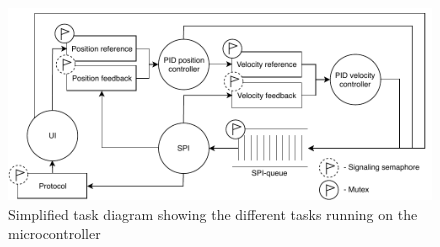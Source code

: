 \documentclass[../../main.tex]{subfiles}
\begin{document}

\begin{figure}[H]
    \centering
    \includegraphics[width=\textwidth]{Sections/System_Implementation/Images/OverviewTaskDiagramSimple.pdf}
    \caption{Simplified task diagram showing the different tasks running on the microcontroller}
    \label{fig:OverviewTaskDiagramSimple}
\end{figure}
\end{document}
